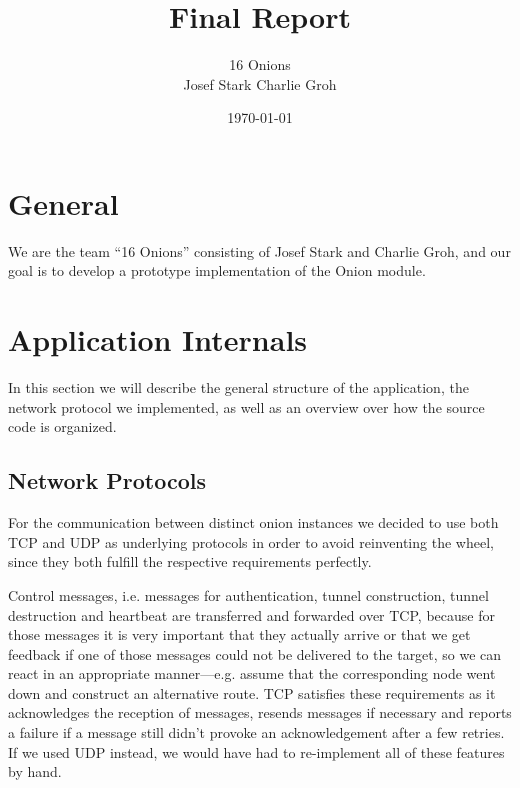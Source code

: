 \documentclass{article}
\begin{document}
\title{\Huge Final Report \normalsize}
\date{\today}
\author{\LARGE 16 Onions \normalsize \\[5pt] Josef Stark \hspace{20pt} Charlie Groh}
\maketitle
{\let\thefootnote\relax{}}

\section{General}
We are the team ``16 Onions'' consisting of Josef Stark and Charlie Groh,
and our goal is to develop a prototype implementation of the Onion module.

\section{Application Internals}
In this section we will describe the general structure of the application, the network protocol we implemented, as well as an overview over how the source code is organized.

\subsection{Network Protocols}
For the communication between distinct onion instances we decided to use both TCP and UDP as underlying protocols in order to avoid reinventing the wheel, since they both fulfill the respective requirements perfectly.

Control messages, i.e. messages for authentication, tunnel construction, tunnel destruction and heartbeat are transferred and forwarded over TCP, because for those messages it is very important that they actually arrive or that we get feedback if one of those messages could not be delivered to the target, so we can react in an appropriate manner---e.g. assume that the corresponding node went down and construct an alternative route. TCP satisfies these requirements as it acknowledges the reception of messages, resends messages if necessary and reports a failure if a message still didn't provoke an acknowledgement after a few retries. If we used UDP instead, we would have had to re-implement all of these features by hand. 
\end{document}
